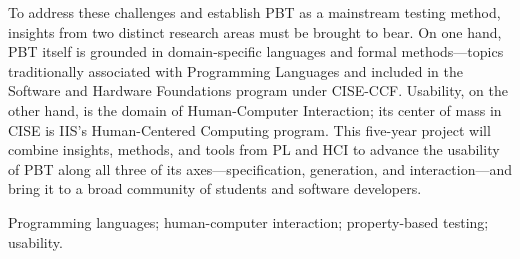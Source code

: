 

To address these challenges and establish PBT as a mainstream
testing method, insights from two distinct research areas must be
brought to bear.
On one hand, PBT itself is grounded in domain-specific languages and
formal methods---topics traditionally associated with Programming
Languages and included in the Software and Hardware Foundations
program under CISE-CCF.  Usability, on the other hand, is the domain
of Human-Computer Interaction; its center of mass in CISE is IIS's
Human-Centered Computing program.
%
This five-year project will combine insights, methods, and tools from
PL and HCI to advance the usability of PBT along all three of its
axes---specification, generation, and interaction\iflater{}\fi---and bring it to a
broad community of students and software developers.

\smallskip

 Programming languages; human-computer
interaction; property-based testing; usability.

